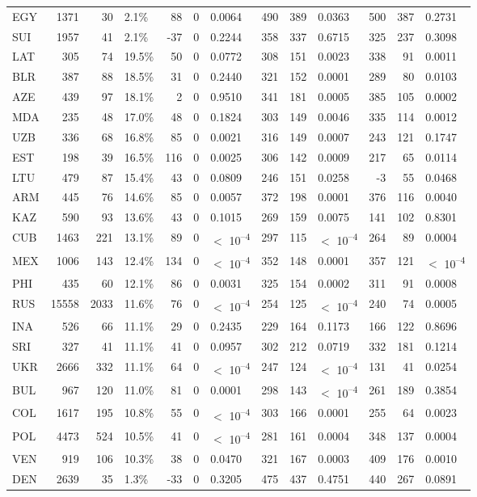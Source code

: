 \begin{tabular}[t]{lrrlrrlrrlrrl}
EGY & 1371 & 30 & 2.1\% & 88 & 0 & 0.0064 & 490 & 389 & 0.0363 & 500 & 387 & 0.2731\\
SUI & 1957 & 41 & 2.1\% & -37 & 0 & 0.2244 & 358 & 337 & 0.6715 & 325 & 237 & 0.3098\\
LAT & 305 & 74 & 19.5\% & 50 & 0 & 0.0772 & 308 & 151 & 0.0023 & 338 & 91 & 0.0011\\
BLR & 387 & 88 & 18.5\% & 31 & 0 & 0.2440 & 321 & 152 & 0.0001 & 289 & 80 & 0.0103\\
AZE & 439 & 97 & 18.1\% & 2 & 0 & 0.9510 & 341 & 181 & 0.0005 & 385 & 105 & 0.0002\\
MDA & 235 & 48 & 17.0\% & 48 & 0 & 0.1824 & 303 & 149 & 0.0046 & 335 & 114 & 0.0012\\
UZB & 336 & 68 & 16.8\% & 85 & 0 & 0.0021 & 316 & 149 & 0.0007 & 243 & 121 & 0.1747\\
EST & 198 & 39 & 16.5\% & 116 & 0 & 0.0025 & 306 & 142 & 0.0009 & 217 & 65 & 0.0114\\
LTU & 479 & 87 & 15.4\% & 43 & 0 & 0.0809 & 246 & 151 & 0.0258 & -3 & 55 & 0.0468\\
ARM & 445 & 76 & 14.6\% & 85 & 0 & 0.0057 & 372 & 198 & 0.0001 & 376 & 116 & 0.0040\\
KAZ & 590 & 93 & 13.6\% & 43 & 0 & 0.1015 & 269 & 159 & 0.0075 & 141 & 102 & 0.8301\\
CUB & 1463 & 221 & 13.1\% & 89 & 0 & $<$ 10\textsuperscript{--4} & 297 & 115 & $<$ 10\textsuperscript{--4} & 264 & 89 & 0.0004\\
MEX & 1006 & 143 & 12.4\% & 134 & 0 & $<$ 10\textsuperscript{--4} & 352 & 148 & 0.0001 & 357 & 121 & $<$ 10\textsuperscript{--4}\\
PHI & 435 & 60 & 12.1\% & 86 & 0 & 0.0031 & 325 & 154 & 0.0002 & 311 & 91 & 0.0008\\
RUS & 15558 & 2033 & 11.6\% & 76 & 0 & $<$ 10\textsuperscript{--4} & 254 & 125 & $<$ 10\textsuperscript{--4} & 240 & 74 & 0.0005\\
INA & 526 & 66 & 11.1\% & 29 & 0 & 0.2435 & 229 & 164 & 0.1173 & 166 & 122 & 0.8696\\
SRI & 327 & 41 & 11.1\% & 41 & 0 & 0.0957 & 302 & 212 & 0.0719 & 332 & 181 & 0.1214\\
UKR & 2666 & 332 & 11.1\% & 64 & 0 & $<$ 10\textsuperscript{--4} & 247 & 124 & $<$ 10\textsuperscript{--4} & 131 & 41 & 0.0254\\
BUL & 967 & 120 & 11.0\% & 81 & 0 & 0.0001 & 298 & 143 & $<$ 10\textsuperscript{--4} & 261 & 189 & 0.3854\\
COL & 1617 & 195 & 10.8\% & 55 & 0 & $<$ 10\textsuperscript{--4} & 303 & 166 & 0.0001 & 255 & 64 & 0.0023\\
POL & 4473 & 524 & 10.5\% & 41 & 0 & $<$ 10\textsuperscript{--4} & 281 & 161 & 0.0004 & 348 & 137 & 0.0004\\
VEN & 919 & 106 & 10.3\% & 38 & 0 & 0.0470 & 321 & 167 & 0.0003 & 409 & 176 & 0.0010\\
DEN & 2639 & 35 & 1.3\% & -33 & 0 & 0.3205 & 475 & 437 & 0.4751 & 440 & 267 & 0.0891\\
\bottomrule
\end{tabular}
